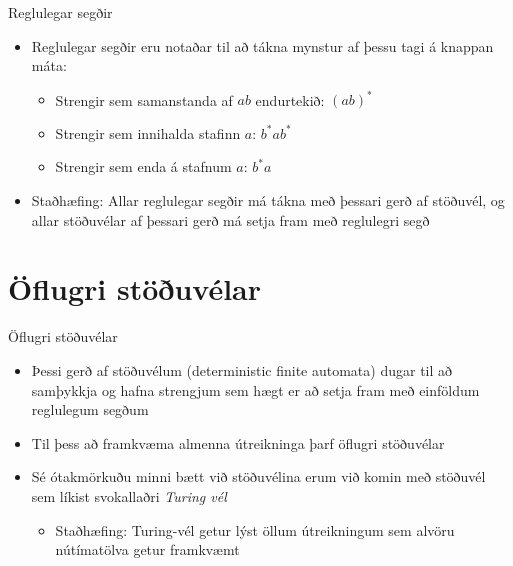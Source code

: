 \documentclass{beamer}
\begin{document}
\begin{frame}{Reglulegar segðir}
\begin{itemize}
 \item Reglulegar segðir eru notaðar til að tákna mynstur af þessu tagi á knappan máta:
 \begin{itemize}
 \item Strengir sem samanstanda af $ab$ endurtekið: $(ab)^*$
 \item Strengir sem innihalda stafinn $a$: $b^*ab^*$
 \item Strengir sem enda á stafnum $a$: $b^*a$
\end{itemize}
 \item Staðhæfing: Allar reglulegar segðir má tákna með þessari gerð af stöðuvél, og allar stöðuvélar af þessari gerð má setja fram með reglulegri segð
\end{itemize}
\end{frame}

\section{Öflugri stöðuvélar}

\begin{frame}{Öflugri stöðuvélar}
\begin{itemize}
 \item Þessi gerð af stöðuvélum (deterministic finite automata) dugar til að samþykkja og hafna strengjum sem hægt er að setja fram með einföldum reglulegum segðum
 \item Til þess að framkvæma almenna útreikninga þarf öflugri stöðuvélar
 \item Sé ótakmörkuðu minni bætt við stöðuvélina erum við komin með stöðuvél sem líkist svokallaðri \emph{Turing vél}
 \begin{itemize}
  \item Staðhæfing: Turing-vél getur lýst öllum útreikningum sem alvöru nútímatölva getur framkvæmt
 \end{itemize}
\end{itemize}
\end{frame}
\end{document}

